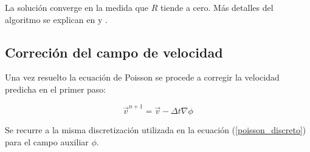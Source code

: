 La solución converge en la medida que $R$ tiende a cero. Más detalles del algoritmo se explican en \cite{patankar} y \cite{versteeg}. 

\subsection{Correción del campo de velocidad}

Una vez resuelto la ecuación de Poisson se procede a corregir la velocidad predicha en el primer paso:

\begin{equation}
\vec{v}^{n+1} = \vec{v} - \Delta t \nabla \phi
\end{equation}

Se recurre a la misma discretización utilizada en la ecuación (\ref{poisson_discreto}) para el campo auxiliar $\phi$.

